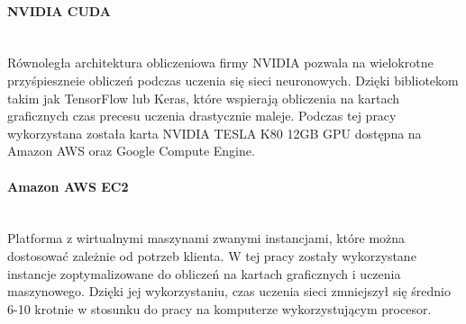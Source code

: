 \paragraph{NVIDIA CUDA} \mbox{}\\
Równoległa architektura obliczeniowa firmy NVIDIA pozwala na wielokrotne
przyśpieszneie obliczeń podczas uczenia się sieci neuronowych. Dzięki bibliotekom
takim jak TensorFlow lub Keras, które wspierają obliczenia na kartach graficznych
czas precesu uczenia drastycznie maleje. Podczas tej pracy wykorzystana została
karta NVIDIA TESLA K80 12GB GPU dostępna na Amazon AWS oraz Google Compute Engine.

\paragraph{Amazon AWS EC2} \mbox{}\\
Platforma z wirtualnymi maszynami zwanymi instancjami, które można dostosować
zależnie od potrzeb klienta. W tej pracy zostały wykorzystane instancje
zoptymalizowane do obliczeń na kartach graficznych i uczenia maszynowego.
Dzięki jej wykorzystaniu, czas uczenia sieci zmniejszył się średnio 6-10 krotnie
w stosunku do pracy na komputerze wykorzystującym procesor.
